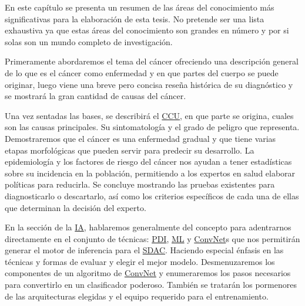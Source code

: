 En este capítulo se presenta un resumen de las áreas del conocimiento más
significativas para la elaboración de esta tesis. No pretende ser una lista
exhaustiva ya que estas áreas del conocimiento son grandes en número y por si
solas son un mundo completo de investigación. 

Primeramente abordaremos el tema del cáncer ofreciendo una descripción general
de lo que es el cáncer como enfermedad y en que partes del cuerpo se puede
originar, luego viene una breve pero concisa reseña histórica de su diagnóstico
y se mostrará la gran cantidad de causas del cáncer.

Una vez sentadas las bases, se describirá el \hyperlink{abbr}{CCU}, en que parte
se origina, cuales son las causas principales. Su sintomatología y el grado de
peligro que representa. Demostraremos que el cáncer es una enfermedad gradual y
que tiene varias etapas morfológicas que pueden servir para predecir su
desarrollo. La epidemiología y los factores de riesgo del cáncer nos ayudan a
tener estadísticas sobre su incidencia en la población, permitiendo a los
expertos en salud elaborar políticas para reducirla. Se concluye mostrando las
pruebas existentes para diagnosticarlo o descartarlo, así como los criterios
específicos de cada una de ellas que determinan la decisión del experto.

En la sección de la \hyperlink{abbr}{IA}, hablaremos generalmente del concepto
para adentrarnos directamente en el conjunto de técnicas: \hyperlink{abbr}{PDI},
\hyperlink{abbr}{ML} y \hyperlink{abbr}{ConvNet}s que nos permitirán generar el
motor de inferencia para el \hyperlink{abbr}{SDAC}. Haciendo especial énfasis en
las técnicas y formas de evaluar y elegir el mejor modelo. Desmenuzaremos los
componentes de un algoritmo de \hyperlink{abbr}{ConvNet} y enumeraremos los
pasos necesarios para convertirlo en un clasificador poderoso. También se
tratarán los pormenores de las arquitecturas elegidas y el equipo requerido para
el entrenamiento.